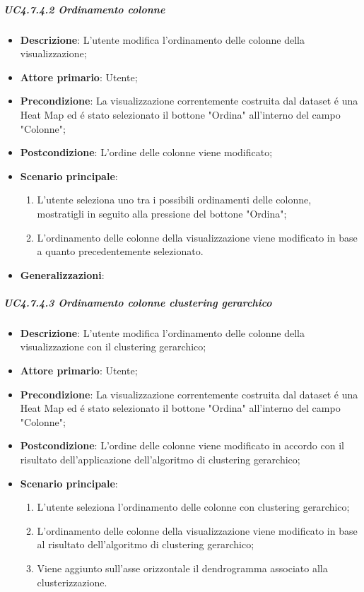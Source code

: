 \subparagraph{UC4.7.4.2 Ordinamento colonne}
\label{spar:uc4.7.4.2}
\begin{itemize}
    \item \textbf{Descrizione}:     L'utente modifica l'ordinamento delle colonne della visualizzazione;
    \item \textbf{Attore primario}: Utente;
    \item \textbf{Precondizione}:   La visualizzazione correntemente costruita dal dataset é una Heat Map ed é stato selezionato il bottone "Ordina" all'interno del campo "Colonne";
    \item \textbf{Postcondizione}:  L'ordine delle colonne viene modificato;
    \item \textbf{Scenario principale}:
    \begin{enumerate}
        \item L'utente seleziona uno tra i possibili ordinamenti delle colonne, mostratigli in seguito alla pressione del bottone "Ordina";
        \item L'ordinamento delle colonne della visualizzazione viene modificato in base a quanto precedentemente selezionato.
    \end{enumerate}
    \item \textbf{Generalizzazioni}:
\end{itemize}

\subparagraph{UC4.7.4.3 Ordinamento colonne clustering gerarchico}
\label{spar:uc4.7.4.3}
\begin{itemize}
    \item \textbf{Descrizione}:     L'utente modifica l'ordinamento delle colonne della visualizzazione con il clustering gerarchico;
    \item \textbf{Attore primario}: Utente;
    \item \textbf{Precondizione}:   La visualizzazione correntemente costruita dal dataset é una Heat Map ed é stato selezionato il bottone "Ordina" all'interno del campo "Colonne";
    \item \textbf{Postcondizione}:  L'ordine delle colonne viene modificato in accordo con il risultato dell'applicazione dell'algoritmo di clustering gerarchico;
    \item \textbf{Scenario principale}:
    \begin{enumerate}
        \item L'utente seleziona l'ordinamento delle colonne con clustering gerarchico;
        \item L'ordinamento delle colonne della visualizzazione viene modificato in base al risultato dell'algoritmo di clustering gerarchico;
        \item Viene aggiunto sull'asse orizzontale il dendrogramma associato alla clusterizzazione.
    \end{enumerate}
\end{itemize}

